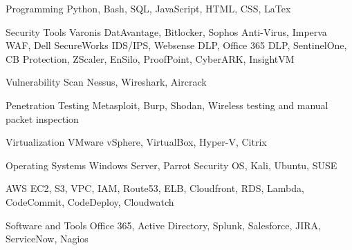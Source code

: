 
\begin{cvskills}
  \cvskill
    {Programming} %
    {Python, Bash, SQL, JavaScript, HTML, CSS, LaTex} %

  \cvskill
    {Security Tools} %
    {Varonis DatAvantage, Bitlocker, Sophos Anti-Virus, Imperva WAF, Dell SecureWorks IDS/IPS,\newline
     Websense DLP, Office 365 DLP, SentinelOne, CB Protection, ZScaler, EnSilo, ProofPoint, CyberARK, InsightVM} %

  \cvskill
     {Vulnerability Scan} %
     {Nessus, Wireshark, Aircrack} %
 
  \cvskill
     {Penetration Testing} %
     {Metasploit, Burp, Shodan, Wireless testing and manual packet inspection} %
 
  \cvskill
    {Virtualization} %
    {VMware vSphere, VirtualBox, Hyper-V, Citrix} %

  \cvskill
    {Operating Systems} %
    {Windows Server, Parrot Security OS, Kali, Ubuntu, SUSE} %

  \cvskill
    {AWS} %
    {EC2, S3, VPC, IAM, Route53, ELB, Cloudfront, RDS, Lambda, CodeCommit, CodeDeploy, Cloudwatch} %

  \cvskill
    {Software and Tools} %
    {Office 365, Active Directory, Splunk, Salesforce, JIRA, ServiceNow, Nagios} %

\end{cvskills}
